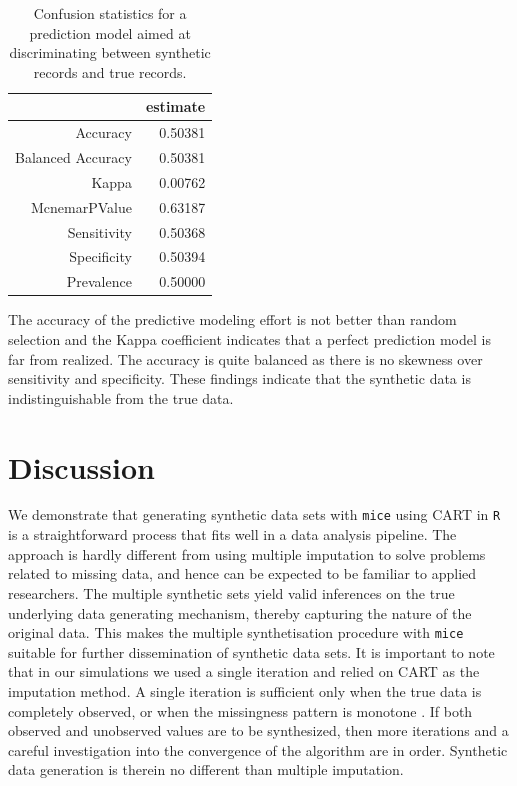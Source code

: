 \documentclass[psych,article,submit,moreauthors,pdftex]{mdpi}
\begin{document}
\begin{table}[H]
\caption{Confusion statistics for a prediction model aimed at discriminating between synthetic records and true records.}
\centering
\begin{tabular}{rr}
  \hline
& estimate\\
  \hline
 Accuracy & 0.50381 \\
 Balanced Accuracy & 0.50381 \\
 Kappa & 0.00762 \\
 McnemarPValue & 0.63187 \\
 Sensitivity & 0.50368 \\
 Specificity & 0.50394 \\
 Prevalence & 0.50000 \\
   \hline
\end{tabular}
\end{table}

The accuracy of the predictive modeling effort is not better than random
selection and the Kappa coefficient indicates that a perfect prediction
model is far from realized. The accuracy is quite balanced as there is
no skewness over sensitivity and specificity. These findings indicate
that the synthetic data is indistinguishable from the true data.

\hypertarget{discussion}{%
\section{Discussion}\label{discussion}}

We demonstrate that generating synthetic data sets with \texttt{mice}
using CART in \texttt{R} is a straightforward process that fits well in
a data analysis pipeline. The approach is hardly different from using
multiple imputation to solve problems related to missing data, and hence
can be expected to be familiar to applied researchers. The multiple
synthetic sets yield valid inferences on the true underlying data
generating mechanism, thereby capturing the nature of the original data.
This makes the multiple synthetisation procedure with \texttt{mice}
suitable for further dissemination of synthetic data sets. It is
important to note that in our simulations we used a single iteration and
relied on CART as the imputation method. A single iteration is
sufficient only when the true data is completely observed, or when the
missingness pattern is monotone \citep{drechsler_synthetic_2011}. If
both observed and unobserved values are to be synthesized, then more
iterations and a careful investigation into the convergence of the
algorithm are in order. Synthetic data generation is therein no
different than multiple imputation.
\end{document}
